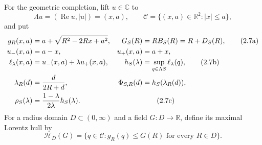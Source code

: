 \documentclass[11pt]{article}
\theoremstyle{remark}
\newcommand{\C}{\mathbb C}
\newcommand{\R}{\mathbb R}
\newcommand{\Rea}{\operatorname{Re}}
\begin{document}
For the geometric completion, lift $u\in\C$ to
\[
 \Lambda u=(\Rea u,|u|)=(x,a),\qquad
 \mathcal C=\{(x,a)\in\R^2:|x|\le a\},
\]
and put
\begin{align}
 g_R(x,a)&=a+\sqrt{R^2-2Rx+a^2},
 &G_S(R)&=RB_S(R)=R+D_S(R),\tag{2.7a}\\
 u_-(x,a)&=a-x,&u_+(x,a)&=a+x,\notag\\
 \ell_\lambda(x,a)&=u_-(x,a)+\lambda u_+(x,a),
 &h_S(\lambda)&=\sup_{q\in\Lambda S}\ell_\lambda(q),\tag{2.7b}\\
 \lambda_R(d)&=\frac d{2R+d},
 &\Phi_{S,R}(d)&=h_S(\lambda_R(d)),\notag\\
 \rho_S(\lambda)&=\frac{1-\lambda}{2\lambda}h_S(\lambda).
 &&\tag{2.7c}
\end{align}
For a radius domain $D\subset(0,\infty)$ and a field $G:D\to\R$, define its maximal Lorentz
hull by
\begin{equation}
 \mathcal H_D(G)=\{q\in\mathcal C:g_R(q)\le G(R)\text{ for every }R\in D\}.
 \tag{2.7d}
\end{equation}
\end{document}
